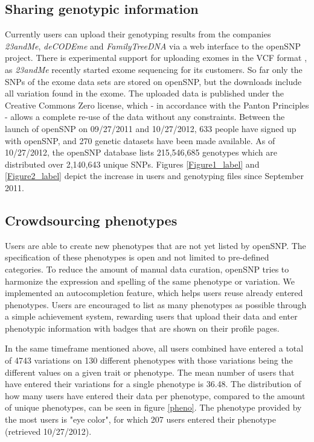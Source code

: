 \documentclass[10pt]{article}
\begin{document}
\subsection*{Sharing genotypic information}
Currently users can upload their genotyping results from the companies \textit{23andMe}, \textit{deCODEme} and \textit{FamilyTreeDNA} via a web interface to the openSNP 
project. There is experimental support for uploading exomes in the VCF format \cite{Danecek01082011}, as \textit{23andMe} recently started exome sequencing for its customers. So far only the SNPs of the exome data sets are stored on openSNP, but the downloads include all variation found in the exome.
The uploaded data is published under the Creative Commons Zero license, 
which - in accordance with the Panton Principles \cite{10.1371/journal.pbio.1001195} - 
allows a complete re-use of the data without any constraints.
Between the launch of openSNP on 09/27/2011 and 10/27/2012, 633 people have signed 
up with openSNP, and 270 genetic datasets have been made available. As of 10/27/2012, the openSNP database lists 215,546,685 genotypes which are distributed over 2,140,643 unique SNPs.
Figures \ref{Figure1_label} and \ref{Figure2_label} depict the increase in users and genotyping files since September 2011.


\subsection*{Crowdsourcing phenotypes}
Users are able to create new phenotypes that are not yet 
listed by openSNP. 
The specification of these phenotypes is open and not limited 
to pre-defined categories. To reduce the amount of manual data curation, openSNP tries to harmonize 
the expression and spelling of the same phenotype or variation. We implemented an 
autocompletion feature, which helps users reuse already entered phenotypes.
Users are encouraged to list as many phenotypes as possible through a simple 
achievement system, rewarding users that upload their data and enter phenotypic 
information with badges that are shown on their profile pages.

In the same timeframe mentioned above, all users combined have 
entered a total of 4743 variations on 130 different phenotypes with those variations being 
the different values on a given trait or phenotype. The mean number of users that have entered their variations for a single phenotype 
is 36.48. The distribution of how many users have 
entered their data per phenotype, compared to the amount of unique phenotypes, can be seen in figure \ref{pheno}. The phenotype provided by the most users is "eye color", for which 207 users entered their phenotype (retrieved 10/27/2012). 
\end{document}
